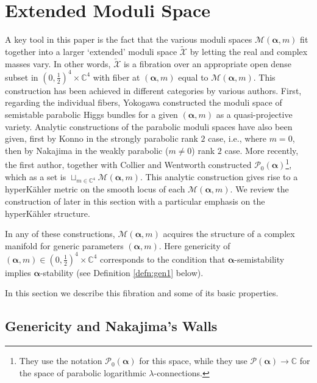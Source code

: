 \documentclass[12pt,letterpaper,reqno]{amsart}
\def\mathbf#1{#1}%
\theoremstyle{remark}
\theoremstyle{definition}
\numberwithin{thm}{section}
\numberwithin{equation}{section}
\numberwithin{figure}{section}
\newcommand{\C}{\ensuremath{\mathbb C}}
\newcommand{\calM}{\mathcal M}
\newcommand{\tcalX}{\widetilde{\mathcal X}}
\newcommand{\bsa}{\boldsymbol{\alpha}}
\newcommand{\bfm}{\mathbf{m}}
\begin{document}
\section{Extended Moduli Space}\label{sec:extended}
A key tool in this paper is the fact that the various moduli spaces $\calM(\bsa,\bfm)$ fit together into a larger `extended' moduli space $\tcalX$
by letting the real and complex masses vary. In other words, $\tcalX$ is a fibration over an appropriate open dense subset in $(0, \frac12)^4 \times \C^4$
with fiber at $(\bsa, \bfm)$ equal to $\calM(\bsa,\bfm)$.    This construction has been achieved in different categories by various authors. 
First, regarding the individual fibers, Yokogawa \cite{yokogawa93} constructed the moduli space of semistable parabolic Higgs bundles 
for a given $(\bsa, \bfm)$ as a quasi-projective variety. Analytic constructions of the parabolic moduli spaces have also been given, first
by Konno \cite{konno93} in the strongly parabolic rank $2$ case, i.e., where $\bfm = 0$, then by Nakajima \cite{Nakajima} in the weakly 
parabolic ($\bfm \neq 0$) rank $2$ case.  More recently, the first author, together with Collier and Wentworth \cite{collier2024conformallimitsparabolicslnchiggs} 
constructed $\mathcal{P}_0(\boldsymbol{\alpha})$\footnote{They use the notation $\mathcal{P}_0(\bsa)$ for this space, while they use $\mathcal{P}(\bsa) \to \mathbb{C}$ for the space of parabolic logarithmic $\lambda$-connections.}, which as a set is $\sqcup_{\bfm \in \C^4}\calM(\bsa, \bfm)$.  This analytic construction gives rise to a hyperK\"ahler metric on the smooth locus of each $\calM(\bsa,\bfm)$. We 
review the construction of \cite{collier2024conformallimitsparabolicslnchiggs} later in this section with a particular emphasis on the hyperK\"ahler structure.

In any of these constructions, $\calM(\bsa, \bfm)$ acquires the structure of a complex manifold for generic parameters $(\bsa,\bfm)$. Here genericity
of $(\bsa, \bfm) \in (0, \frac12)^4 \times \C^4$ corresponds to the condition that $\bsa$-semistability implies $\bsa$-stability (see Definition \ref{defn:gen1} below). 

In this section we describe this fibration and some of its basic properties. 

\subsection{Genericity and Nakajima's Walls}\label{subsec:period_domain}
\end{document}
